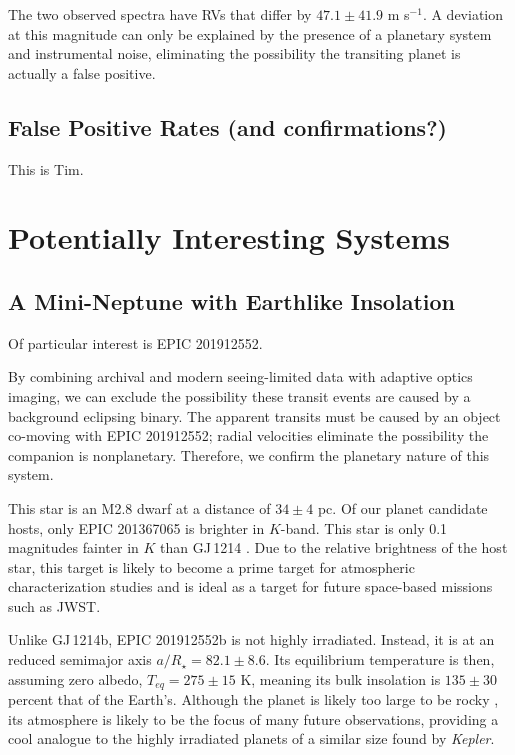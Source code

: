 \documentclass{emulateapj}
\newcommand{\ars}{{$a/R_{\star}$}}
\newcommand{\project}[1]{\textsl{#1}}
\newcommand{\kep}{\project{Kepler}}
\begin{document}
The two observed spectra have RVs that differ by $47.1 \pm 41.9$ m s$^{-1}$.
A deviation at this magnitude can only be explained by the presence of 
a planetary system and instrumental noise, eliminating the possibility the
transiting planet is actually a false positive.



\subsection{False Positive Rates (and confirmations?)}
This is Tim.

\section{Potentially Interesting Systems}
\subsection{A Mini-Neptune with Earthlike Insolation}

Of particular interest is EPIC 201912552. 

By combining archival and modern seeing-limited data with adaptive optics 
imaging, we can exclude the possibility these transit events are caused by 
a background eclipsing binary.
The apparent transits must be caused by an object co-moving with EPIC 201912552;
radial velocities eliminate the possibility the companion is nonplanetary.
Therefore, we confirm the planetary nature of this system.

This star is an M2.8 dwarf at a distance of $34\pm4$ pc.
Of our planet candidate hosts, only EPIC 201367065 \citep[originally
discovered by][]{Crossfield15} is brighter in $K$-band.
This star is only 0.1 magnitudes fainter in $K$ than GJ\,1214 
\citep{Charbonneau09}.
Due to the relative brightness of the host star, this target is likely
to become a prime target for atmospheric characterization studies
and is ideal as a target for future space-based missions such as JWST.

Unlike GJ\,1214b, EPIC 201912552b is not highly irradiated. 
Instead, it is at an reduced semimajor axis \ars$ = 82.1 \pm 8.6$.
Its equilibrium temperature is then, assuming zero albedo, $T_{eq} = 275 \pm 15$
K, meaning its bulk insolation is $135 \pm 30$ percent that of the Earth's.
Although the planet is likely too large to be rocky \citep{Rogers14}, 
its atmosphere is likely to be the focus of many future observations, providing
a cool analogue to the highly irradiated planets of a similar size found by 
\kep.
\end{document}
